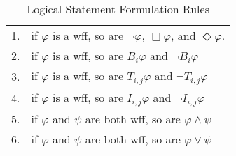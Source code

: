 \begin{table}[]
\small
\centering
\caption{Logical Statement Formulation Rules}
\begin{tabular}{r l}
1. & if $\varphi$ is a wff, so are $\neg \varphi$, $\Box \varphi$, and $\Diamond \varphi$. \\
2. & if $\varphi$ is a wff, so are $B_i \varphi$ and $\neg B_i \varphi$ \\
3. & if $\varphi$ is a wff, so are $T_{i,j} \varphi$ and $\neg T_{i,j} \varphi$ \\
4. & if $\varphi$ is a wff, so are $I_{i,j} \varphi$ and $\neg I_{i,j} \varphi$ \\
5. & if $\varphi$ and $\psi$ are both wff, so are $\varphi \wedge \psi$ \\
6. & if $\varphi$ and $\psi$ are both wff, so are $\varphi \vee \psi$ \\
\end{tabular}
\label{tab:wffs}
\end{table}

